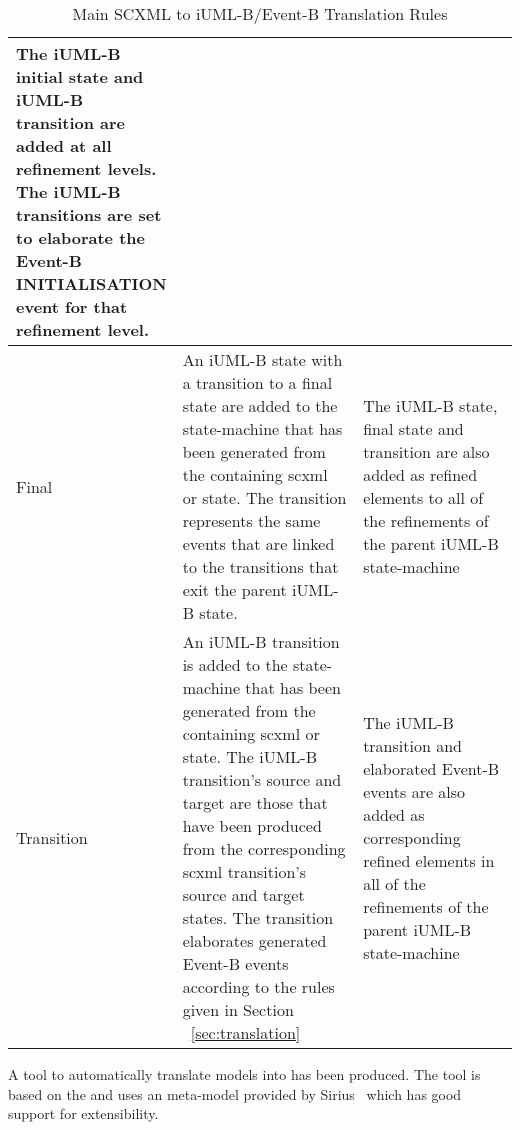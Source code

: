 \begin{EventBNoShortInline}
\begin{table}[]
\begin{tabular}{@{}p{0.25\linewidth}p{0.4\linewidth}p{0.35\linewidth}@{}}
		The iUML-B initial state and iUML-B transition are added at all refinement levels. The iUML-B transitions are set to elaborate the Event-B INITIALISATION event for that refinement level.
		\\\hline
		Final &
		An iUML-B state with a transition to a final state are added to the state-machine that has been generated from the containing scxml or state. The transition represents the same events that are linked to the transitions that exit the parent iUML-B state. &
		The iUML-B state, final state and transition are also added as refined elements to all of the refinements of the parent iUML-B state-machine
		\\\hline
		Transition &
		An iUML-B transition is added to the state-machine that has been generated from the containing scxml or state. The iUML-B transition’s source and target are those that have been produced from the corresponding scxml transition’s source and target states. 
		The transition elaborates generated Event-B events according to the rules given in Section ~\ref{sec:translation} &
		The iUML-B transition and elaborated Event-B events are also added as corresponding refined elements in all of the refinements of the parent iUML-B state-machine
		\\\hline																	
	\end{tabular}
	\caption{Main SCXML to iUML-B/Event-B Translation Rules}
	\label{tab:translation_rules}
  \end{table}
\end{EventBNoShortInline}

A tool to automatically translate \SCXML models into \iUMLB has been produced. 
The tool is based on the \EMF and uses an \SCXML meta-model provided by Sirius~\cite{siriuswebsite} which has good support for extensibility. 


